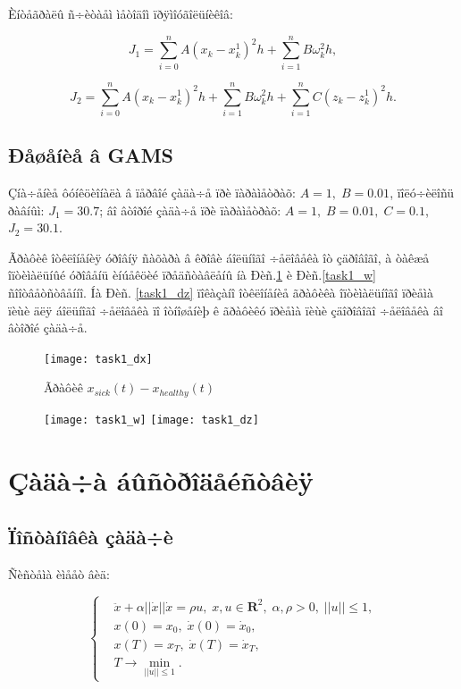 \documentclass[14pt]{article}
\begin{document}
Èíòåãðàëû ñ÷èòàåì ìåòîäîì ïðÿìîóãîëüíèêîâ:

$$
    J_1 =\sum_{i=0}^n A(x_k-x_k^1)^2 h + \sum_{i=1}^n B\omega_k^2 h,
$$

$$
    J_2 =\sum_{i=0}^n A(x_k-x_k^1)^2 h + \sum_{i=1}^n B\omega_k^2 h + \sum_{i=1}^n C(z_k - z_k^1)^2 h.
$$


\subsection{Ðåøåíèå â GAMS}

Çíà÷åíèå ôóíêöèîíàëà â ïåðâîé çàäà÷å ïðè ïàðàìåòðàõ: $A=1,\;B=0.01$, ïîëó÷èëîñü ðàâíûì: $J_1 = 30.7$; âî âòîðîé çàäà÷å ïðè ïàðàìåòðàõ: $A=1,\;B=0.01,\; C=0.1$, $J_2 = 30.1$.

Ãðàôèê îòêëîíåíèÿ óðîâíÿ ñàõàðà â êðîâè áîëüíîãî ÷åëîâåêà îò çäðîâîãî, à òàêæå îïòèìàëüíûé óðîâåíü èíúåêöèé ïðåäñòàâëåíû íà Ðèñ.\ref{task1_dx} è Ðèñ.\ref{task1_w} ñîîòâåòñòâåííî.
Íà Ðèñ. \ref{task1_dz} ïîêàçàíî îòêëîíåíèå ãðàôèêà îïòèìàëüíîãî ïðèåìà ïèùè äëÿ áîëüíîãî ÷åëîâåêà ïî îòíîøåíèþ ê ãðàôèêó ïðèåìà ïèùè çäîðîâîãî ÷åëîâåêà âî âòîðîé çàäà÷å.

\begin{figure}
\centering
\texttt{[image: task1\_dx]}
\caption{Ãðàôèê $x_{sick}(t)-x_{healthy}(t)$}
\label{task1_dx}
\end{figure}

\begin{figure}
\begin{floatrow}
    {\texttt{[image: task1\_w]}}
    {\texttt{[image: task1\_dz]}}
\end{floatrow}
\end{figure}


\newpage

\section{Çàäà÷à áûñòðîäåéñòâèÿ}
\subsection{Ïîñòàíîâêà çàäà÷è}

Ñèñòåìà èìååò âèä:

\begin{equation}\label{syst2}
\left\{ \begin{aligned}
& \ddot{x}+\alpha||\dot{x}||\dot{x} = \rho u, \; x,u \in \textbf{R}^2, \; \alpha,\rho > 0,\;  ||u|| \le 1, \\
& x(0)=x_0, \; \dot{x}(0) = \dot{x}_0, \\
& x(T)=x_T, \; \dot{x}(T) = \dot{x}_T, \\
& T \rightarrow \min_{||u|| \le 1}.
\end{aligned}\right.
\end{equation}
\end{document}
